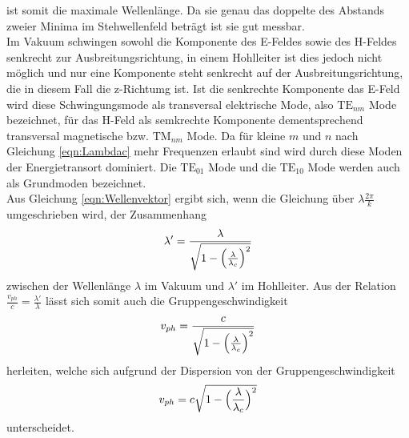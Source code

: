 ist somit die maximale Wellenlänge. Da sie genau das doppelte des Abstands zweier Minima im Stehwellenfeld
beträgt ist sie gut messbar. \\
Im Vakuum schwingen sowohl die Komponente des E-Feldes sowie des H-Feldes senkrecht zur Ausbreitungsrichtung, in
einem Hohlleiter ist dies jedoch nicht möglich und nur eine Komponente steht senkrecht auf der Ausbreitungsrichtung,
die in diesem Fall die z-Richtumg ist. Ist die senkrechte Komponente das E-Feld wird diese Schwingungsmode
als transversal elektrische Mode, also $\text{TE}_{nm}$ Mode bezeichnet, für das H-Feld als semkrechte
Komponente dementsprechend transversal magnetische bzw. $\text{TM}_{nm}$ Mode. Da für kleine
$m$ und $n$ nach Gleichung \ref{eqn:Lambdac} mehr Frequenzen erlaubt sind wird durch diese Moden der Energietransort
dominiert. Die $\text{TE}_{01}$ Mode und die $\text{TE}_{10}$ Mode werden auch als Grundmoden
bezeichnet. \\
Aus Gleichung \ref{eqn:Wellenvektor} ergibt sich, wenn die Gleichung über $\lambda\frac{2\pi}{k}$
umgeschrieben wird, der Zusammenhang
\begin{equation}
  \lambda'=\frac{\lambda}{\sqrt{1-\Bigl(\frac{\lambda}{\lambda_c}\Bigr)^2}}
  \label{eqn:zsmhl}
\end{equation}
zwischen der Wellenlänge $\lambda$ im Vakuum und $\lambda'$ im Hohlleiter.
Aus der Relation $\frac{v_{ph}}{c}=\frac{\lambda'}{\lambda}$ lässt sich somit auch die Gruppengeschwindigkeit
\begin{equation}
  v_{ph}=\frac{c}{\sqrt{1-\Bigl(\frac{\lambda}{\lambda_c}\Bigr)^2}}
  \label{eqn:vphase}
\end{equation}
herleiten, welche sich aufgrund der Dispersion von der Gruppengeschwindigkeit
\begin{equation}
    v_{ph}=c\sqrt{1-\Bigl(\frac{\lambda}{\lambda_c}\Bigr)^2}
  \label{eqn:vgruppe}
\end{equation}
unterscheidet.


